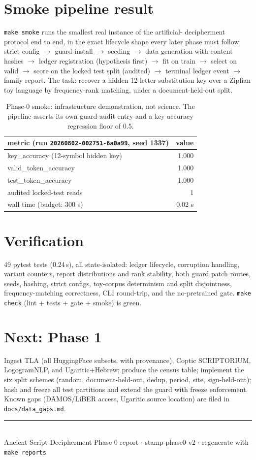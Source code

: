 \documentclass[11pt]{article}
\newcommand{\ReportStamp}{phase0-v2}
\begin{document}
\section{Smoke pipeline result}
\texttt{make smoke} runs the smallest real instance of the artificial-
decipherment protocol end to end, in the exact lifecycle shape every later
phase must follow: strict config $\to$ guard install $\to$ seeding $\to$ data
generation with content hashes $\to$ ledger registration (hypothesis first)
$\to$ fit on train $\to$ select on valid $\to$ score on the locked test split
(audited) $\to$ terminal ledger event $\to$ family report. The task: recover a
hidden 12-letter substitution key over a Zipfian toy language by
frequency-rank matching, under a document-held-out split.

\begin{table}[h]\centering
\begin{tabular}{lr}
\toprule
metric (run \texttt{20260802-002751-6a0a99}, seed 1337) & value \\
\midrule
key\_accuracy (12-symbol hidden key)   & 1.000 \\
valid\_token\_accuracy                 & 1.000 \\
test\_token\_accuracy                  & 1.000 \\
audited locked-test reads              & 1 \\
wall time (budget: 300 s)              & 0.02 s \\
\bottomrule
\end{tabular}
\caption{Phase-0 smoke: infrastructure demonstration, not science. The
pipeline asserts its own guard-audit entry and a key-accuracy regression
floor of 0.5.}
\end{table}

\section{Verification}
49 pytest tests (0.24\,s), all state-isolated: ledger lifecycle, corruption
handling, variant counters, report distributions and rank stability, both
guard patch routes, seeds, hashing, strict configs, toy-corpus determinism
and split disjointness, frequency-matching correctness, CLI round-trip, and
the no-pretrained gate. \texttt{make check} (lint + tests + gate + smoke) is
green.

\section{Next: Phase 1}
Ingest TLA (all HuggingFace subsets, with provenance), Coptic SCRIPTORIUM,
LogogramNLP, and Ugaritic+Hebrew; produce the census table; implement the six
split schemes (random, document-held-out, dedup, period, site, sign-held-out);
hash and freeze all test partitions and extend the guard with freeze
enforcement. Known gaps (D\=AMOS/LiBER access, Ugaritic source location) are
filed in \texttt{docs/data\_gaps.md}.

\vfill
\noindent\rule{\linewidth}{0.4pt}\\
{\small Ancient Script Decipherment Phase 0 report \(\cdot\) stamp \ReportStamp{} \(\cdot\)
regenerate with \texttt{make reports}}
\end{document}
